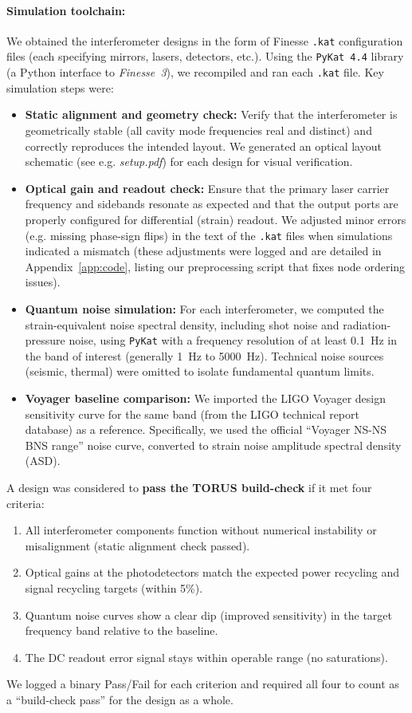 \documentclass[12pt]{article}
\begin{document}
\paragraph{Simulation toolchain:} We obtained the interferometer designs in the form of Finesse \texttt{.kat} configuration files (each specifying mirrors, lasers, detectors, etc.). Using the \texttt{PyKat 4.4} library (a Python interface to \emph{Finesse~3}), we recompiled and ran each \texttt{.kat} file. Key simulation steps were:
\begin{itemize}\itemsep 0pt
    \item \textbf{Static alignment and geometry check:} Verify that the interferometer is geometrically stable (all cavity mode frequencies real and distinct) and correctly reproduces the intended layout. We generated an optical layout schematic (see e.g. \emph{setup.pdf}) for each design for visual verification.
    \item \textbf{Optical gain and readout check:} Ensure that the primary laser carrier frequency and sidebands resonate as expected and that the output ports are properly configured for differential (strain) readout. We adjusted minor errors (e.g. missing phase-sign flips) in the text of the \texttt{.kat} files when simulations indicated a mismatch (these adjustments were logged and are detailed in Appendix~\ref{app:code}, listing our preprocessing script that fixes node ordering issues).
    \item \textbf{Quantum noise simulation:} For each interferometer, we computed the strain-equivalent noise spectral density, including shot noise and radiation-pressure noise, using \texttt{PyKat} with a frequency resolution of at least 0.1~Hz in the band of interest (generally 1~Hz to 5000~Hz). Technical noise sources (seismic, thermal) were omitted to isolate fundamental quantum limits.
    \item \textbf{Voyager baseline comparison:} We imported the LIGO Voyager design sensitivity curve for the same band (from the LIGO technical report database) as a reference. Specifically, we used the official “Voyager NS-NS BNS range” noise curve, converted to strain noise amplitude spectral density (ASD).
\end{itemize}

A design was considered to \textbf{pass the TORUS build-check} if it met four criteria:
\begin{enumerate}\itemsep 0pt
    \item All interferometer components function without numerical instability or misalignment (static alignment check passed).
    \item Optical gains at the photodetectors match the expected power recycling and signal recycling targets (within 5\%).
    \item Quantum noise curves show a clear dip (improved sensitivity) in the target frequency band relative to the baseline.
    \item The DC readout error signal stays within operable range (no saturations).
\end{enumerate}
We logged a binary Pass/Fail for each criterion and required all four to count as a “build-check pass” for the design as a whole.
\end{document}
